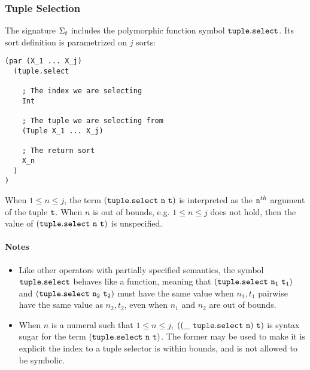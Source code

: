 \documentclass[english,a4paper,10pt]{article}
\begin{document}
\subsubsection{Tuple Selection}
The signature $\Sigma_{t}$ includes 
the polymorphic function symbol ${\tt tuple.select}$.
Its sort definition is parametrized on $j$ sorts:
\begin{verbatim}
(par (X_1 ... X_j) 
  (tuple.select
    
    ; The index we are selecting 
    Int
    
    ; The tuple we are selecting from
    (Tuple X_1 ... X_j)
    
    ; The return sort
    X_n
  )
)
\end{verbatim}
When $1 \leq n \leq j$,
the term $\syntax{(tuple.select\ n\ t)}$ is
interpreted as the ${\tt n}^{th}$ argument of the tuple ${\tt t}$.
When $n$ is out of bounds, e.g. $1 \leq n \leq j$ does not hold,
then the value of $\syntax{(tuple.select\ n\ t)}$ is unspecified.

\paragraph{Notes}
\begin{itemize}
\item Like other operators with partially specified semantics,
the symbol ${\tt tuple.select}$ behaves like a function, meaning
that ${\tt (tuple.select\ n_1\ t_1)}$ and  ${\tt (tuple.select\ n_2\ t_2)}$
must have the same value when $n_1, t_1$ pairwise have the same value as $n_2, t_2$,
even when $n_1$ and $n_2$ are out of bounds.
\item When $n$ is a numeral such that $1 \leq n \leq j$,
${\tt ((\_\ tuple.select\ n)\ t)}$ is syntax sugar for the term
$\syntax{(tuple.select\ n\ t)}$.
The former may be used to make it is explicit the index to a tuple selector
is within bounds, and is not allowed to be symbolic.
\end{itemize}
\end{document}
